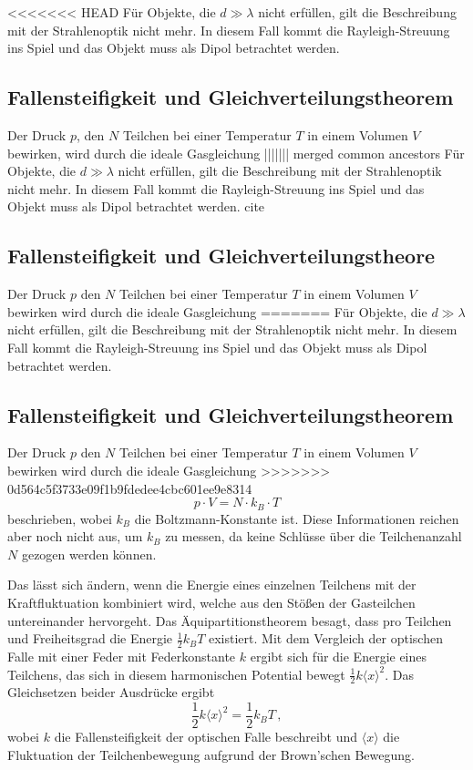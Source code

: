<<<<<<< HEAD
    Für Objekte, die $d\gg\lambda$ nicht erfüllen, gilt die Beschreibung mit der Strahlenoptik nicht mehr. In diesem Fall kommt die Rayleigh-Streuung ins Spiel und das Objekt muss als Dipol betrachtet werden. \cite{neumann}
  \subsection{Fallensteifigkeit und Gleichverteilungstheorem}
    Der Druck $p$, den $N$ Teilchen bei einer Temperatur $T$ in einem Volumen $V$ bewirken, wird durch die ideale Gasgleichung
||||||| merged common ancestors
    Für Objekte, die $d\gg\lambda$ nicht erfüllen, gilt die Beschreibung mit der Strahlenoptik nicht mehr. In diesem Fall kommt die Rayleigh-Streuung ins Spiel und das Objekt muss als Dipol betrachtet werden. cite
  \subsection{Fallensteifigkeit und Gleichverteilungstheore}
    Der Druck $p$ den $N$ Teilchen bei einer Temperatur $T$ in einem Volumen $V$ bewirken wird durch die ideale Gasgleichung
=======
    Für Objekte, die $d\gg\lambda$ nicht erfüllen, gilt die Beschreibung mit der Strahlenoptik nicht mehr. In diesem Fall kommt die Rayleigh-Streuung ins Spiel und das Objekt muss als Dipol betrachtet werden. \cite{neumann}
  \subsection{Fallensteifigkeit und Gleichverteilungstheorem}
    Der Druck $p$ den $N$ Teilchen bei einer Temperatur $T$ in einem Volumen $V$ bewirken wird durch die ideale Gasgleichung
>>>>>>> 0d564c5f3733e09f1b9fdedee4cbc601ee9e8314
    \begin{equation}
      p\cdot V = N\cdot k_B\cdot T
    \end{equation}
    beschrieben, wobei $k_B$ die Boltzmann-Konstante ist. Diese Informationen reichen aber noch nicht aus, um $k_B$ zu messen, da keine Schlüsse über die Teilchenanzahl $N$ gezogen werden können.

    Das lässt sich ändern, wenn die Energie eines einzelnen Teilchens mit der Kraftfluktuation kombiniert wird, welche aus den Stößen der Gasteilchen untereinander hervorgeht. Das Äquipartitionstheorem besagt, dass pro Teilchen und Freiheitsgrad die Energie $\frac{1}{2}k_BT$ existiert. Mit dem Vergleich der optischen Falle mit einer Feder mit Federkonstante $k$ ergibt sich für die Energie eines Teilchens, das sich in diesem harmonischen Potential bewegt $\frac{1}{2}k\langle x\rangle^2$. Das Gleichsetzen beider Ausdrücke ergibt
    \begin{equation}
      \frac{1}{2}k\langle x\rangle^2 = \frac{1}{2}k_BT \, ,
    \end{equation}
    wobei $k$ die Fallensteifigkeit der optischen Falle beschreibt und $\langle x\rangle$  die Fluktuation der Teilchenbewegung aufgrund der Brown'schen Bewegung.

